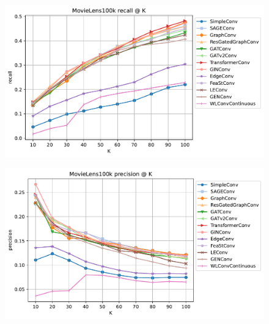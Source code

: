 \documentclass{scrartcl}
\begin{document}
\begin{figure}
\begin{center}
\begin{minipage}[b]{0.48\textwidth}
    \centering
    \includegraphics[width=\textwidth]{imgs/MovieLens100k_recall.pdf}
    \label{fig:recall}
\end{minipage}
\hfill
\begin{minipage}[b]{0.48\textwidth}
    \centering
    \includegraphics[width=\textwidth]{imgs/MovieLens100k_precision.pdf}
    \label{fig:precision}
\end{minipage}


\end{center}
\end{figure}
\end{document}
